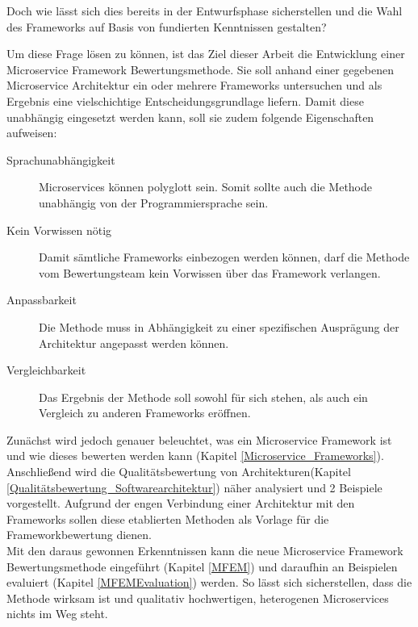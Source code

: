 Doch wie lässt sich dies bereits in der Entwurfsphase sicherstellen und die Wahl des Frameworks auf Basis von fundierten Kenntnissen gestalten?

Um diese Frage lösen zu können, ist das Ziel dieser Arbeit die Entwicklung einer Microservice Framework Bewertungsmethode. Sie soll anhand einer gegebenen Microservice Architektur ein oder mehrere Frameworks untersuchen und als Ergebnis eine vielschichtige Entscheidungsgrundlage liefern.
Damit diese unabhängig eingesetzt werden kann, soll sie zudem folgende Eigenschaften aufweisen:

\begin{description}
	\item[Sprachunabhängigkeit] 
	Microservices können polyglott sein. Somit sollte auch die Methode unabhängig von der Programmiersprache sein.
	\item[Kein Vorwissen nötig] 
	Damit sämtliche Frameworks einbezogen werden können, darf die Methode vom Bewertungsteam kein Vorwissen über das Framework verlangen.
	\item[Anpassbarkeit] 
	Die Methode muss in Abhängigkeit zu einer spezifischen Ausprägung der Architektur angepasst werden können.
	\item[Vergleichbarkeit] 
	Das Ergebnis der Methode soll sowohl für sich stehen, als auch ein Vergleich zu anderen Frameworks eröffnen.
\end{description}

Zunächst wird jedoch genauer beleuchtet, was ein Microservice Framework ist und wie dieses bewerten werden kann (Kapitel \ref{Microservice_Frameworks}).
Anschließend wird die Qualitätsbewertung von Architekturen(Kapitel \ref{Qualitätsbewertung_Softwarearchitektur}) näher analysiert und 2 Beispiele vorgestellt. Aufgrund der engen Verbindung einer Architektur mit den Frameworks sollen diese etablierten Methoden als Vorlage für die Frameworkbewertung dienen.\\
Mit den daraus gewonnen Erkenntnissen kann die neue Microservice Framework Bewertungsmethode eingeführt (Kapitel \ref{MFEM}) und daraufhin an Beispielen evaluiert (Kapitel \ref{MFEMEvaluation}) werden. 
So lässt sich sicherstellen, dass die Methode wirksam ist und qualitativ hochwertigen, heterogenen Microservices nichts im Weg steht.